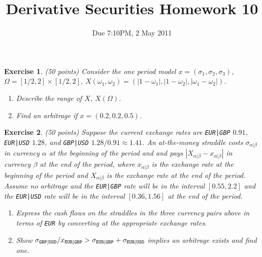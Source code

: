\documentclass[11pt,fleqn]{amsproc}
\newtheorem{xca}{Exercise}
\begin{document}
\title{Derivative Securities Homework 10}
\author{Due 7:10PM, 2 May 2011}

\maketitle

\begin{xca}{(50 points)}
Consider the one period model $x = (\sigma_1, \sigma_2, \sigma_3)$,
$\Omega = [1/2,2] \times [1/2, 2]$, $X(\omega_1, \omega_2)
= (|1 - \omega_1|, |1 - \omega_2|, |\omega_1 - \omega_2|)$.
\begin{enumerate}
\item Describe the range of $X$, $X(\Omega)$.
\item Find an arbitrage if $x = (0.2, 0.2, 0.5)$.
\end{enumerate}
\end{xca}

\begin{xca}{(50 points)}
Suppose the current exchange rates are {\small\tt EUR|GBP} $0.91$,
{\small\tt EUR|USD} $1.28$, and {\small\tt GBP|USD} $1.28/0.91 \approx
1.41$. An at-the-money straddle costs $\sigma_{\alpha|\beta}$ in currency
$\alpha$ at the beginning of the period and and pays $|X_{\alpha|\beta}
- x_{\alpha|\beta}|$ in currency $\beta$ at the end of the period,
where $x_{\alpha|\beta}$ is the exchange rate at the beginning of the
period and $X_{\alpha|\beta}$ is the exchange rate at the end of the
period. Assume no arbitrage and the {\small\tt EUR|GBP} rate will be in
the interval $[0.55, 2.2]$ and the {\small\tt EUR|USD} rate will be in
the interval $[0.36, 1.56]$ at the end of the period.
\begin{enumerate}
\item Express the cash flows on the straddles in the three currency
pairs above in terms of {\small\tt EUR} by converting at the appropriate
exchange rates.
\item Show $\sigma_{\tt GBP|USD}/x_{\tt EUR|GBP} > \sigma_{\tt EUR|GBP}
+ \sigma_{\tt EUR|USD}$ implies an arbitrage exists and find one.
\end{enumerate}
\end{xca}
\end{document}
